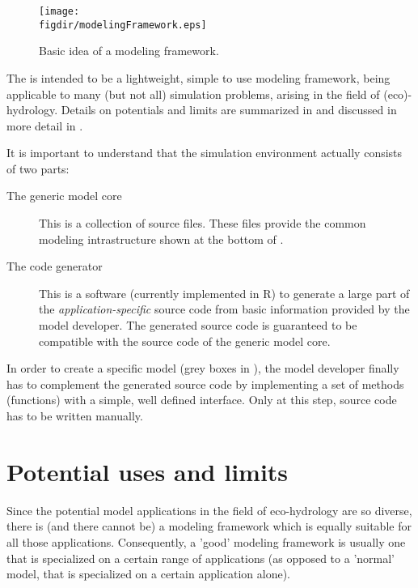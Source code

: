 \begin{figure}
  \centering
  \texttt{[image: \\figdir/modelingFramework.eps]}
  \caption{Basic idea of a modeling framework. \label{fig:intro-modelingFramework}}
\end{figure}

The  is intended to be a lightweight, simple to use modeling framework, being applicable to many (but not all) simulation problems, arising in the field of (eco)-hydrology. Details on potentials and limits are summarized in  and discussed in more detail in .

It is important to understand that the  simulation environment actually consists of two parts:
\begin{description}
  \item [The generic model core] This is a collection of source files. These files provide the common modeling intrastructure shown at the bottom of .
  \item [The code generator] This is a software (currently implemented in R) to generate a large part of the \emph{application-specific} source code from basic information provided by the model developer. The generated source code is guaranteed to be compatible with the source code of the generic model core.
\end{description}

In order to create a specific model (grey boxes in ), the model developer finally has to complement the generated source code by implementing a set of methods (functions) with a simple, well defined interface. Only at this step, source code has to be written manually.

\section{Potential uses and limits} \label{sec:intro_potentials-limits}

Since the potential model applications in the field of eco-hydrology are so diverse, there is (and there cannot be) a modeling framework which is equally suitable for all those applications. Consequently, a 'good' modeling framework is usually one that is specialized on a certain range of applications (as opposed to a 'normal' model, that is specialized on a certain application alone).


